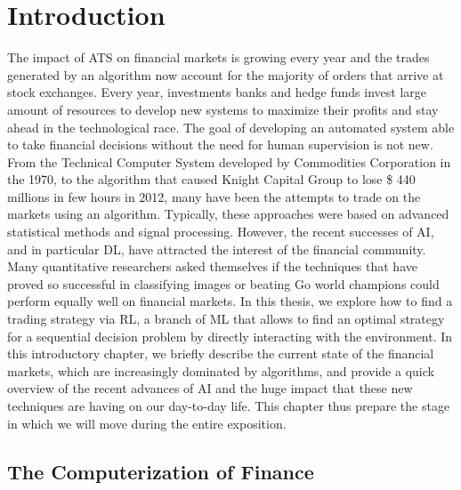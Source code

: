 \chapter{Introduction}

The impact of \gls{ATS} on financial markets is growing every year and the trades generated by an algorithm now account for the majority of orders that arrive at stock exchanges. Every year, investments banks and hedge funds invest large amount of resources to develop new systems to maximize their profits and stay ahead in the technological race. The goal of developing an automated system able to take financial decisions without the need for human supervision is not new. From the Technical Computer System developed by Commodities Corporation in the 1970, to the algorithm that caused Knight Capital Group to lose \$ 440 millions in few hours in 2012, many have been the attempts to trade on the markets using an algorithm. Typically, these approaches were based on advanced statistical methods and signal processing. However, the recent successes of \gls{AI}, and in particular \gls{DL}, have attracted the interest of the financial community. Many quantitative researchers asked themselves if the techniques that have proved so successful in classifying images or beating Go world champions could perform equally well on financial markets. In this thesis, we explore how to find a trading strategy via \gls{RL}, a branch of \gls{ML} that allows to find an optimal strategy for a sequential decision problem by directly interacting with the environment. In this introductory chapter, we briefly describe the current state of the financial markets, which are increasingly dominated by algorithms, and provide a quick overview of the recent advances of \gls{AI} and the huge impact that these new techniques are having on our day-to-day life. This chapter thus prepare the stage in which we will move during the entire exposition. 

\section{The Computerization of Finance}


